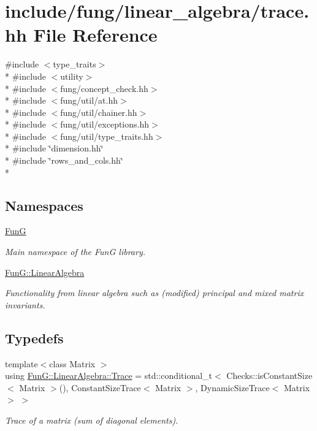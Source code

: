 \hypertarget{trace_8hh}{}\section{include/fung/linear\+\_\+algebra/trace.hh File Reference}
\label{trace_8hh}
{\ttfamily \#include $<$type\+\_\+traits$>$}\\*
{\ttfamily \#include $<$utility$>$}\\*
{\ttfamily \#include $<$fung/concept\+\_\+check.\+hh$>$}\\*
{\ttfamily \#include $<$fung/util/at.\+hh$>$}\\*
{\ttfamily \#include $<$fung/util/chainer.\+hh$>$}\\*
{\ttfamily \#include $<$fung/util/exceptions.\+hh$>$}\\*
{\ttfamily \#include $<$fung/util/type\+\_\+traits.\+hh$>$}\\*
{\ttfamily \#include \char`\"{}dimension.\+hh\char`\"{}}\\*
{\ttfamily \#include \char`\"{}rows\+\_\+and\+\_\+cols.\+hh\char`\"{}}\\*
\subsection*{Namespaces}
\begin{DoxyCompactItemize}
\item 
 \hyperlink{namespaceFunG}{FunG}
\begin{DoxyCompactList}\small\item\em Main namespace of the FunG library. \end{DoxyCompactList}\item 
 \hyperlink{namespaceFunG_1_1LinearAlgebra}{Fun\+G\+::\+Linear\+Algebra}
\begin{DoxyCompactList}\small\item\em Functionality from linear algebra such as (modified) principal and mixed matrix invariants. \end{DoxyCompactList}\end{DoxyCompactItemize}
\subsection*{Typedefs}
\begin{DoxyCompactItemize}
\item 
{\footnotesize template$<$class Matrix $>$ }\\using \hyperlink{group__LinearAlgebraGroup_ga43e327309edc349c75ceecd29b7abde2}{Fun\+G\+::\+Linear\+Algebra\+::\+Trace} = std\+::conditional\+\_\+t$<$ Checks\+::is\+Constant\+Size$<$ Matrix $>$(), Constant\+Size\+Trace$<$ Matrix $>$, Dynamic\+Size\+Trace$<$ Matrix $>$ $>$
\begin{DoxyCompactList}\small\item\em Trace of a matrix (sum of diagonal elements). \end{DoxyCompactList}\end{DoxyCompactItemize}
